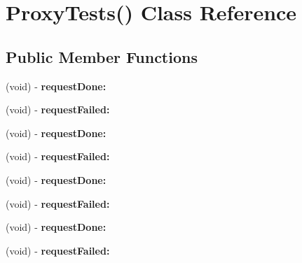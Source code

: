 \hypertarget{interface_proxy_tests_07_08}{
\section{\-Proxy\-Tests() \-Class \-Reference}
\label{interface_proxy_tests_07_08}
}
\subsection*{\-Public \-Member \-Functions}
\begin{DoxyCompactItemize}
\item 
\hypertarget{interface_proxy_tests_07_08_af754998401726574506376807a512a11}{
(void) -\/ {\bfseries request\-Done\-:}}
\label{interface_proxy_tests_07_08_af754998401726574506376807a512a11}

\item 
\hypertarget{interface_proxy_tests_07_08_a0d105115a121611f0b0fa697a0841a67}{
(void) -\/ {\bfseries request\-Failed\-:}}
\label{interface_proxy_tests_07_08_a0d105115a121611f0b0fa697a0841a67}

\item 
\hypertarget{interface_proxy_tests_07_08_af754998401726574506376807a512a11}{
(void) -\/ {\bfseries request\-Done\-:}}
\label{interface_proxy_tests_07_08_af754998401726574506376807a512a11}

\item 
\hypertarget{interface_proxy_tests_07_08_a0d105115a121611f0b0fa697a0841a67}{
(void) -\/ {\bfseries request\-Failed\-:}}
\label{interface_proxy_tests_07_08_a0d105115a121611f0b0fa697a0841a67}

\item 
\hypertarget{interface_proxy_tests_07_08_af754998401726574506376807a512a11}{
(void) -\/ {\bfseries request\-Done\-:}}
\label{interface_proxy_tests_07_08_af754998401726574506376807a512a11}

\item 
\hypertarget{interface_proxy_tests_07_08_a0d105115a121611f0b0fa697a0841a67}{
(void) -\/ {\bfseries request\-Failed\-:}}
\label{interface_proxy_tests_07_08_a0d105115a121611f0b0fa697a0841a67}

\item 
\hypertarget{interface_proxy_tests_07_08_af754998401726574506376807a512a11}{
(void) -\/ {\bfseries request\-Done\-:}}
\label{interface_proxy_tests_07_08_af754998401726574506376807a512a11}

\item 
\hypertarget{interface_proxy_tests_07_08_a0d105115a121611f0b0fa697a0841a67}{
(void) -\/ {\bfseries request\-Failed\-:}}
\label{interface_proxy_tests_07_08_a0d105115a121611f0b0fa697a0841a67}


\end{DoxyCompactItemize}
